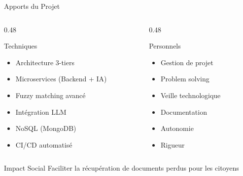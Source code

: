 \documentclass[aspectratio=169]{beamer}
\begin{document}
\begin{frame}{Apports du Projet}
    \begin{columns}[T]
        \begin{column}{0.48\textwidth}
            \begin{block}{Techniques}
                \begin{itemize}
                    \item Architecture 3-tiers
                    \item Microservices (Backend + IA)
                    \item Fuzzy matching avancé
                    \item Intégration LLM
                    \item NoSQL (MongoDB)
                    \item CI/CD automatisé
                \end{itemize}
            \end{block}
        \end{column}
        \begin{column}{0.48\textwidth}
            \begin{block}{Personnels}
                \begin{itemize}
                    \item Gestion de projet
                    \item Problem solving
                    \item Veille technologique
                    \item Documentation
                    \item Autonomie
                    \item Rigueur
                \end{itemize}
            \end{block}
        \end{column}
    \end{columns}

    \vspace{0.5cm}

    \begin{alertblock}{Impact Social}
        Faciliter la récupération de documents perdus pour les citoyens
    \end{alertblock}
\end{frame}
\end{document}
